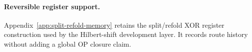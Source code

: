 





\paragraph{Reversible register support.}
Appendix~\ref{app:split-refold-memory} retains the split/refold XOR
register construction used by the Hilbert-shift development layer.
It records route history without adding a global OP closure claim.
